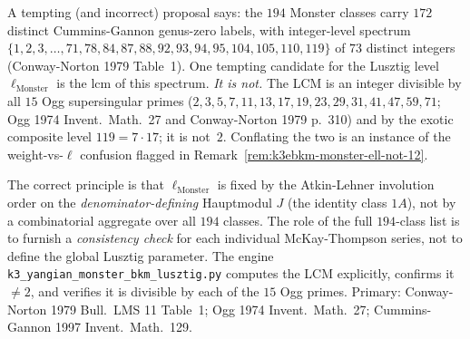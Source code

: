 \begin{remark}
\label{rem:k3ebkm-witten-class-spectrum-vs-ell}
A tempting (and incorrect) proposal says: the $194$ Monster classes
carry $172$ distinct Cummins-Gannon genus-zero labels, with
integer-level spectrum $\{1, 2, 3, \ldots, 71, 78, 84, 87, 88, 92,
93, 94, 95, 104, 105, 110, 119\}$ of $73$ distinct integers
(Conway-Norton 1979 Table~1). One tempting candidate for the Lusztig
level $\ell_{\mathrm{Monster}}$ is the $\mathrm{lcm}$ of this spectrum.
\emph{It is not.} The LCM is an integer divisible by all $15$ Ogg
supersingular primes ($2, 3, 5, 7, 11, 13, 17, 19, 23, 29, 31,
41, 47, 59, 71$; Ogg 1974 Invent.\ Math.~27 and Conway-Norton
1979 p.~310) and by the exotic composite level $119 = 7\cdot 17$;
it is not~$2$. Conflating the two is an instance of the
weight-vs-$\ell$ confusion flagged in
Remark~\ref{rem:k3ebkm-monster-ell-not-12}.

The correct principle is that $\ell_{\mathrm{Monster}}$ is fixed by
the Atkin-Lehner involution order on the \emph{denominator-defining}
Hauptmodul $J$ (the identity class $1A$), not by a combinatorial
aggregate over all $194$ classes. The role of the full $194$-class
list is to furnish a \emph{consistency check} for each individual
McKay-Thompson series, not to define the global Lusztig parameter.
The engine \texttt{k3\_yangian\_monster\_bkm\_lusztig.py}
computes the LCM explicitly, confirms it $\ne 2$, and verifies it
is divisible by each of the $15$ Ogg primes. Primary: Conway-Norton
1979 Bull.\ LMS 11 Table~1; Ogg 1974 Invent.\ Math.~27;
Cummins-Gannon 1997 Invent.\ Math.~129.
\end{remark}


